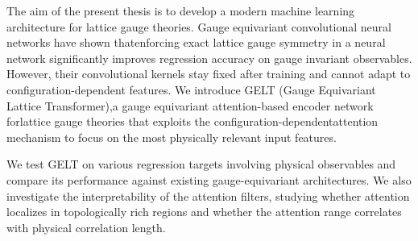 The aim of the present thesis is to develop a modern machine learning architecture for lattice gauge theories. Gauge equivariant convolutional neural networks have shown thatenforcing exact lattice gauge symmetry in a neural network significantly improves regression accuracy on gauge invariant observables. However, their convolutional kernels stay fixed after training and cannot adapt to configuration-dependent features. We introduce GELT (Gauge Equivariant Lattice Transformer),a gauge equivariant attention-based encoder network forlattice gauge theories that exploits the configuration-dependentattention mechanism to focus on the most physically relevant input features. 

We test GELT on various regression targets involving physical observables and compare its performance against existing gauge-equivariant architectures. We also investigate the interpretability of the attention filters, studying whether attention localizes in topologically rich regions and whether the attention range correlates with physical correlation length.
